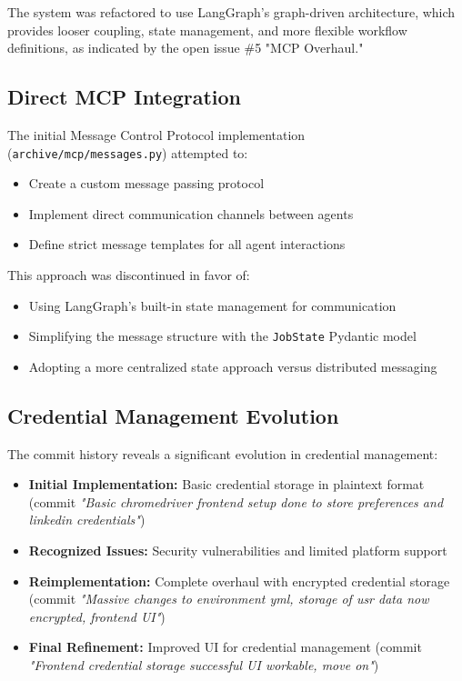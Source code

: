 \documentclass[a4paper,12pt]{article}
\begin{document}
The system was refactored to use LangGraph's graph-driven architecture, which provides looser coupling, state management, and more flexible workflow definitions, as indicated by the open issue \#5 "MCP Overhaul."

\subsection{Direct MCP Integration}

The initial Message Control Protocol implementation (\texttt{archive/mcp/messages.py}) attempted to:

\begin{itemize}
    \item Create a custom message passing protocol
    \item Implement direct communication channels between agents
    \item Define strict message templates for all agent interactions
\end{itemize}

This approach was discontinued in favor of:
\begin{itemize}
    \item Using LangGraph's built-in state management for communication
    \item Simplifying the message structure with the \texttt{JobState} Pydantic model
    \item Adopting a more centralized state approach versus distributed messaging
\end{itemize}

\subsection{Credential Management Evolution}

The commit history reveals a significant evolution in credential management:

\begin{itemize}
    \item \textbf{Initial Implementation:} Basic credential storage in plaintext format (commit \textit{"Basic chromedriver frontend setup done to store preferences and linkedin credentials"})
    \item \textbf{Recognized Issues:} Security vulnerabilities and limited platform support
    \item \textbf{Reimplementation:} Complete overhaul with encrypted credential storage (commit \textit{"Massive changes to environment yml, storage of usr data now encrypted, frontend UI"})
    \item \textbf{Final Refinement:} Improved UI for credential management (commit \textit{"Frontend credential storage successful UI workable, move on"})
\end{itemize}
\end{document}

